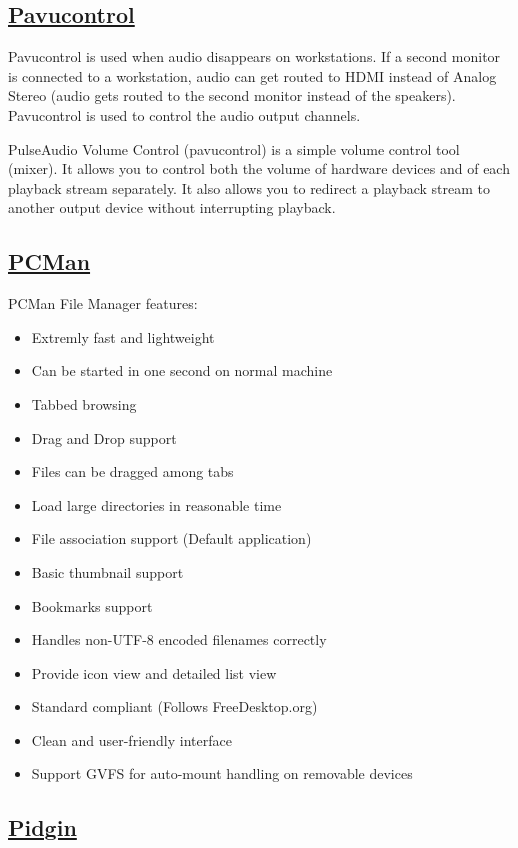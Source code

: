 \subsection{\href{http://0pointer.de/lennart/projects/pavucontrol/}{Pavucontrol}}

Pavucontrol is used when audio disappears on workstations.
If a second monitor is connected to a workstation, audio can get routed to
HDMI instead of Analog Stereo (audio gets routed to the second monitor instead
of the speakers). Pavucontrol is used to control the audio output channels.

 PulseAudio Volume Control (pavucontrol) is a simple volume
 control tool (mixer).
 It allows you to control both the volume of
 hardware devices and of each playback stream separately. It also allows
 you to redirect a playback stream to another output device without
 interrupting playback.

\subsection{\href{http://pcmanfm.sourceforge.net/}{PCMan}}

 PCMan File Manager features:
 
\begin{itemize}
 \item Extremly fast and lightweight
 \item Can be started in one second on normal machine
 \item Tabbed browsing
 \item Drag and Drop support
 \item Files can be dragged among tabs
 \item Load large directories in reasonable time
 \item File association support (Default application)
 \item Basic thumbnail support
 \item Bookmarks support
 \item Handles non-UTF-8 encoded filenames correctly
 \item Provide icon view and detailed list view
 \item Standard compliant (Follows FreeDesktop.org)
 \item Clean and user-friendly interface
 \item Support GVFS for auto-mount handling on removable devices
\end{itemize}

\subsection{\href{http://www.pidgin.im}{Pidgin}}

